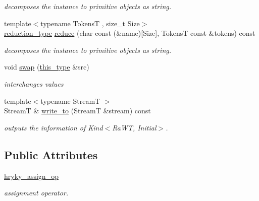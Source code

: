 \begin{DoxyCompactItemize}
\begin{DoxyCompactList}\small\item\em decomposes the instance to primitive objects as string. \end{DoxyCompactList}\item 
\hypertarget{classhryky_1_1_kind_a0a5d6d29bae3ac1b1bdd01fd90763b66}{{\footnotesize template$<$typename Tokens\-T , size\-\_\-t Size$>$ }\\\hyperlink{namespacehryky_a343a9a4c36a586be5c2693156200eadc}{reduction\-\_\-type} \hyperlink{classhryky_1_1_kind_a0a5d6d29bae3ac1b1bdd01fd90763b66}{reduce} (char const (\&name)\mbox{[}Size\mbox{]}, Tokens\-T const \&tokens) const }\label{classhryky_1_1_kind_a0a5d6d29bae3ac1b1bdd01fd90763b66}

\begin{DoxyCompactList}\small\item\em decomposes the instance to primitive objects as string. \end{DoxyCompactList}\item 
void \hyperlink{classhryky_1_1_kind_a3d9362db97d8529581597a8068d43cfb}{swap} (\hyperlink{classhryky_1_1_kind}{this\-\_\-type} \&src)
\begin{DoxyCompactList}\small\item\em interchanges values \end{DoxyCompactList}\item 
\hypertarget{classhryky_1_1_kind_a1c070e6cf60cc110690142667089c3ff}{{\footnotesize template$<$typename Stream\-T $>$ }\\Stream\-T \& \hyperlink{classhryky_1_1_kind_a1c070e6cf60cc110690142667089c3ff}{write\-\_\-to} (Stream\-T \&stream) const }\label{classhryky_1_1_kind_a1c070e6cf60cc110690142667089c3ff}

\begin{DoxyCompactList}\small\item\em outputs the information of Kind$<$\-Ra\-W\-T, Initial$>$. \end{DoxyCompactList}\end{DoxyCompactItemize}
\subsection*{Public Attributes}
\begin{DoxyCompactItemize}
\item 
\hypertarget{classhryky_1_1_kind_a1f23a580751341dd0b0cecd20928ca12}{\hyperlink{classhryky_1_1_kind_a1f23a580751341dd0b0cecd20928ca12}{hryky\-\_\-assign\-\_\-op}}\label{classhryky_1_1_kind_a1f23a580751341dd0b0cecd20928ca12}

\begin{DoxyCompactList}\small\item\em assignment operator. \end{DoxyCompactList}\end{DoxyCompactItemize}


